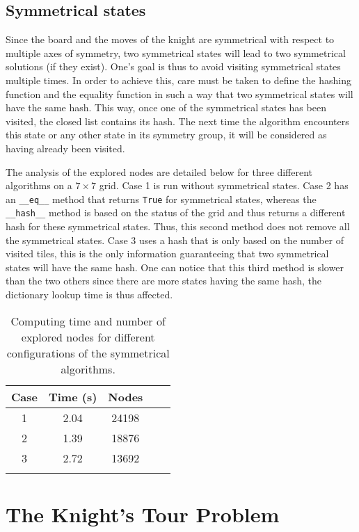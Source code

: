\documentclass[journal]{IEEEtran}
\newcommand{\py}[1]{\texttt{#1}}
\begin{document}
 \subsection{Symmetrical states}
 Since the board and the moves of the knight are symmetrical with respect to multiple axes of symmetry, two symmetrical states will lead to two symmetrical solutions (if they exist).
 One's goal is thus to avoid visiting symmetrical states multiple times. 
 In order to achieve this, care must be taken to define the hashing function and the equality function in such a way that two symmetrical states will have the same hash.
 This way, once one of the symmetrical states has been visited, the closed list contains its hash.
 The next time the algorithm encounters this state or any other state in its symmetry group, it will be considered as having already been visited.
 
 The analysis of the explored nodes are detailed below for three different algorithms on a $7\times7$ grid.
 Case 1 is run without symmetrical states.
 Case 2 has an \py{__eq__} method that returns \py{True} for symmetrical states, whereas the \py{__hash__} method is based on the status of the grid and thus returns a different hash for these symmetrical states.
 Thus, this second method does not remove all the symmetrical states.
 Case 3 uses a hash that is only based on the number of visited tiles, this is the only information guaranteeing that two symmetrical states will have the same hash. One can notice that this third method is slower than the two others since there are more states having the same hash, the dictionary lookup time is thus affected.
 
\begin{table}[!hbtp]
	\centering
\begin{tabular}{ccccc} 
 \toprule
  Case & Time (\si{\second}) & Nodes\\
  \midrule
 1 & 2.04 & 24198\\
 2 & 1.39 & 18876\\
 3 & 2.72 & 13692\\
 \bottomrule\\
\end{tabular}
\caption{Computing time and number of explored nodes for different configurations of the symmetrical algorithms.}
\end{table}

\section{The Knight’s Tour Problem}
\end{document}
